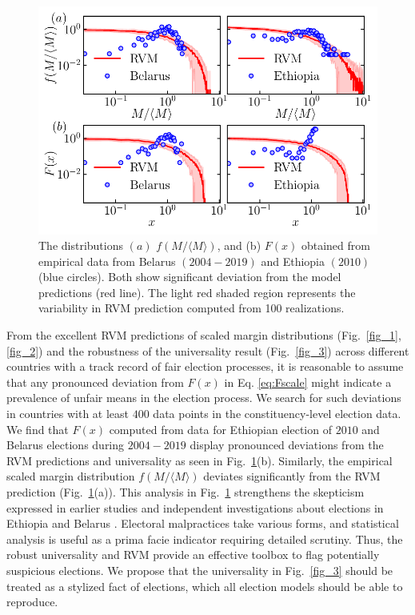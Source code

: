 \documentclass[reprint,aps,prl,showpacs,twocolumn, superscriptaddress]{revtex4-2}
\begin{document}
\begin{figure}[t]
    \includegraphics[width=\columnwidth]{fig_4.pdf}
    \caption{ The distributions $(a)$ $f(M/\langle M \rangle)$, and (b) $F(x)$ obtained from empirical data from Belarus $(2004-2019)$ and Ethiopia $(2010)$ (blue circles). Both show significant deviation from the model predictions (red line). The light red shaded region represents the variability in RVM prediction computed from 100 realizations.}
    \label{fig_4}
\end{figure}
From the excellent RVM predictions of scaled margin distributions (Fig.~\ref{fig_1}, \ref{fig_2}) and the robustness of the universality result (Fig.~\ref{fig_3}) across different countries with a track record of fair election processes, it is reasonable to assume that any pronounced deviation from $F(x)$ in Eq. \ref{eq:Fscale} might indicate a prevalence of unfair means in the election process. We search for such deviations in countries with at least $400$ data points in the constituency-level election data. We find that $F(x)$ computed from data for Ethiopian election of $2010$ and Belarus elections during $2004-2019$ display pronounced deviations from the RVM predictions and universality as seen in Fig.~\ref{fig_4}(b). Similarly, the empirical scaled margin distribution $f(M / \langle M \rangle)$ deviates significantly from the RVM prediction (Fig.~\ref{fig_4}(a)). This analysis in Fig.~\ref{fig_4} strengthens the skepticism expressed in earlier studies and independent investigations about elections in Ethiopia \cite{brigaldino2011elections} and Belarus \cite{belarus_report,frear2014parliamentary,bedford_2021,czwolek2021belarusian}. Electoral malpractices take various forms, and statistical analysis is useful as a prima facie indicator requiring detailed scrutiny. Thus, the robust universality and RVM provide an effective toolbox to flag potentially suspicious elections. We propose that the universality in Fig.~\ref{fig_3} should be treated as a stylized fact of elections, which all election models should be able to reproduce.
\end{document}
